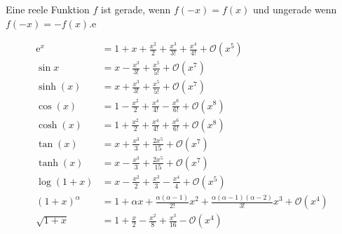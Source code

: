 
Eine reele Funktion $f$ ist gerade, wenn $f(-x) = f(x)$ und ungerade wenn $f(-x) = -f(x)$.e


\begin{align*}
        \mathrm{e}^x &= 1+x+\frac{x^2}{2}+\frac{x^3}{3!}+\frac{x^4}{4!}+\mathcal{O}(x^5) \\
        \sin{x} &= x-\frac{x^3}{3!}+\frac{x^5}{5!}+\mathcal{O}(x^7) \\
        \sinh(x) &= x+\frac{x^3}{3!}+\frac{x^5}{5!}+\mathcal{O}(x^7) \\
        \cos(x) &= 1-\frac{x^2}{2}+\frac{x^4}{4!}-\frac{x^6}{6!}+\mathcal{O}(x^8) \\
        \cosh(x) &= 1+\frac{x^2}{2}+\frac{x^4}{4!}+\frac{x^6}{6!}+\mathcal{O}(x^8) \\
        \tan(x) &= x+\frac{x^3}{3}+\frac{2x^5}{15}+\mathcal{O}(x^7) \\
        \tanh(x) &= x-\frac{x^3}{3}+\frac{2x^5}{15}+\mathcal{O}(x^7) \\
        \log(1+x) &= x-\frac{x^2}{2}+\frac{x^3}{3}-\frac{x^4}{4}+\mathcal{O}(x^5) \\
        (1+x)^\alpha &= 1+\alpha x+\frac{\alpha(\alpha-1)}{2!}x^2+ \frac{\alpha(\alpha - 1)(\alpha - 2)}{3!}x^3 + \mathcal{O}(x^4) \\
        \sqrt{1+x} &= 1 + \frac{x}{2} - \frac{x^2}{8} + \frac{x^3}{16} - \mathcal{O}(x^4)
\end{align*}


\columnbreak



